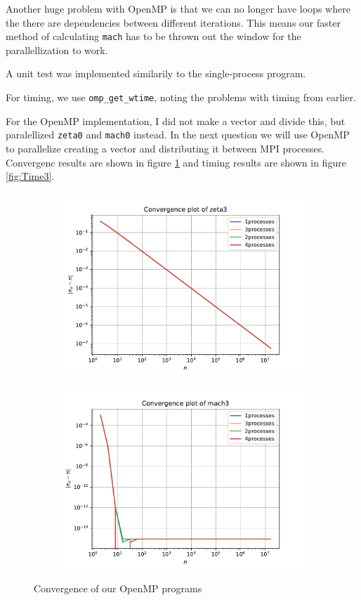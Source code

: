 \documentclass[12pt]{article}
\begin{document}
Another huge problem with OpenMP is that we can no longer have loops where the there are dependencies between different iterations. This means our faster method of calculating
\texttt{mach} has to be thrown out the window for the parallellization to work.

A unit test was implemented similarily to the single-process program.

For timing, we use \texttt{omp\_get\_wtime}, noting the problems with timing from earlier.

For the OpenMP implementation, I did not make a vector and divide this, but paralellized \texttt{zeta0} and \texttt{mach0} instead. In the next question we will use OpenMP to parallelize 
creating a vector and distributing it between MPI processes. Convergenc results are shown in figure \ref{fig:Convergence3} and timing results are shown in figure \ref{fig:Time3}.
\begin{figure}
    \centering
    \begin{subfigure}[!htb]{0.45\textwidth}
        \includegraphics[width=\textwidth]{zeta3Convergence}
    \end{subfigure}
    \begin{subfigure}[!htb]{0.45\textwidth}
        \includegraphics[width=\textwidth]{mach3Convergence}
    \end{subfigure}
    \caption{Convergence of our OpenMP programs}\label{fig:Convergence3}
\end{figure}
\end{document}
